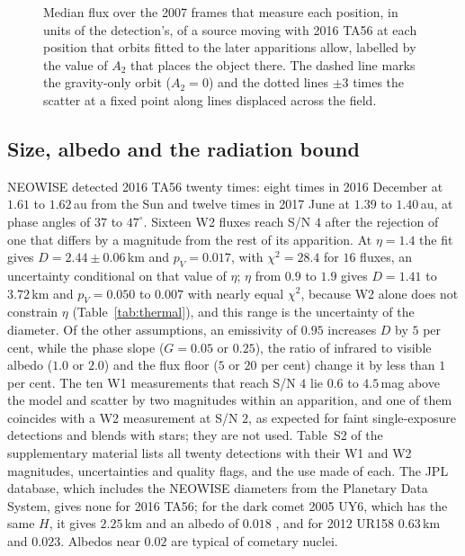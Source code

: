 \documentclass[3p,11pt]{elsarticle}
\begin{document}
\begin{figure}[tbp]
\caption{Median flux over the 2007 frames that measure each position, in units of the
detection's, of a source moving with 2016 TA56 at each position that orbits fitted to the
later apparitions allow,
labelled by the value of $A_2$ that places the object there. The dashed line marks the
gravity-only orbit ($A_2=0$) and the dotted lines $\pm3$ times the scatter at a fixed point
along lines displaced across the field.}
\label{fig:locus}
\end{figure}

\subsection{Size, albedo and the radiation bound}

NEOWISE detected 2016 TA56 twenty times: eight times in 2016 December at $1.61$ to
$1.62$\,au from the Sun and twelve times in 2017 June at $1.39$ to $1.40$\,au, at phase
angles of $37$ to $47^\circ$. Sixteen W2 fluxes reach S/N $4$ after the rejection of one
that differs by a magnitude from the rest of its apparition. At $\eta=1.4$ the fit gives
$D=2.44\pm0.06$\,km and $p_V=0.017$, with $\chi^2=28.4$ for $16$ fluxes, an uncertainty
conditional on that value of $\eta$; $\eta$ from $0.9$ to $1.9$ gives $D=1.41$ to
$3.72$\,km and $p_V=0.050$ to $0.007$ with nearly equal $\chi^2$, because W2 alone does not
constrain $\eta$ (Table~\ref{tab:thermal}), and this range is the uncertainty of the
diameter. Of the other assumptions, an emissivity of
$0.95$ increases $D$ by $5$ per cent, while the phase slope ($G=0.05$ or $0.25$), the ratio
of infrared to visible albedo ($1.0$ or $2.0$) and the flux floor ($5$ or $20$ per cent)
change it by less than $1$ per cent. The ten W1 measurements that reach S/N $4$ lie $0.6$
to $4.5$\,mag above the model and scatter by two magnitudes within an apparition, and one
of them coincides with a W2 measurement at S/N $2$, as expected for faint single-exposure
detections and blends with stars; they are not used. Table~S2 of the supplementary
material lists all twenty detections with their W1 and W2 magnitudes, uncertainties and
quality flags, and the use made of each. The JPL database,
which includes the NEOWISE diameters from the Planetary Data System, gives none for
2016 TA56; for the dark comet 2005 UY6, which has the same $H$, it gives $2.25$\,km and an
albedo of $0.018$ \citep{Masiero2017}, and for 2012 UR158 $0.63$\,km and $0.023$. Albedos
near $0.02$ are typical of cometary nuclei.
\end{document}
